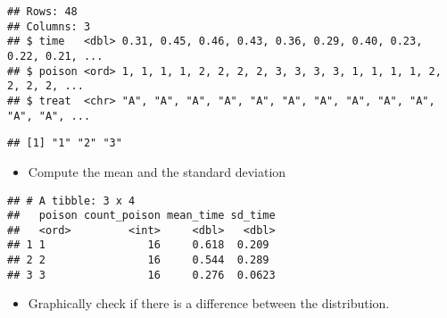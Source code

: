 \documentclass[]{article}
\newenvironment{Shaded}{\begin{snugshade}}{\end{snugshade}}
\newcommand{\DataTypeTok}[1]{\textcolor[rgb]{0.13,0.29,0.53}{#1}}
\newcommand{\KeywordTok}[1]{\textcolor[rgb]{0.13,0.29,0.53}{\textbf{#1}}}
\newcommand{\NormalTok}[1]{#1}
\newcommand{\OperatorTok}[1]{\textcolor[rgb]{0.81,0.36,0.00}{\textbf{#1}}}
\newcommand{\OtherTok}[1]{\textcolor[rgb]{0.56,0.35,0.01}{#1}}
\newcommand{\StringTok}[1]{\textcolor[rgb]{0.31,0.60,0.02}{#1}}
\providecommand{\tightlist}{%
  \setlength{\itemsep}{0pt}\setlength{\parskip}{0pt}}
\begin{document}
\begin{verbatim}
## Rows: 48
## Columns: 3
## $ time   <dbl> 0.31, 0.45, 0.46, 0.43, 0.36, 0.29, 0.40, 0.23, 0.22, 0.21, ...
## $ poison <ord> 1, 1, 1, 1, 2, 2, 2, 2, 3, 3, 3, 3, 1, 1, 1, 1, 2, 2, 2, 2, ...
## $ treat  <chr> "A", "A", "A", "A", "A", "A", "A", "A", "A", "A", "A", "A", ...
\end{verbatim}

\begin{Shaded}
\end{Shaded}

\begin{verbatim}
## [1] "1" "2" "3"
\end{verbatim}

\begin{itemize}
\tightlist
\item
  Compute the mean and the standard deviation
\end{itemize}

\begin{Shaded}
\end{Shaded}

\begin{verbatim}
## # A tibble: 3 x 4
##   poison count_poison mean_time sd_time
##   <ord>         <int>     <dbl>   <dbl>
## 1 1                16     0.618  0.209 
## 2 2                16     0.544  0.289 
## 3 3                16     0.276  0.0623
\end{verbatim}

\begin{itemize}
\tightlist
\item
  Graphically check if there is a difference between the distribution.
\end{itemize}
\end{document}
